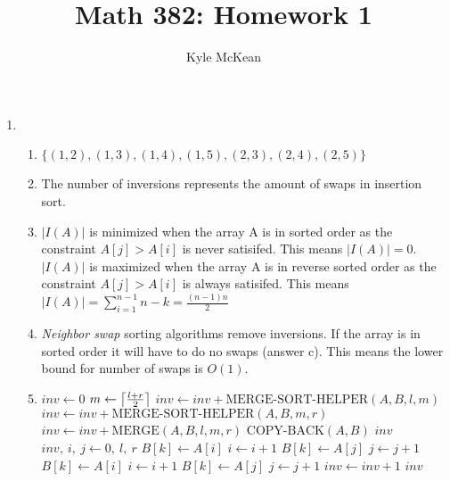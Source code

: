 \documentclass{article}
\title{Math 382: Homework 1}
\author{Kyle McKean}
\DeclarePairedDelimiter{\ceil}{\lceil}{\rceil}
\begin{document}
\maketitle

\begin{enumerate}

\item
  \begin{enumerate}
  \item $\{(1, 2), (1, 3), (1,4), (1,5), (2,3), (2,4), (2,5)\}$
  \item The number of inversions represents the amount of swaps in insertion sort.
  \item
    $|I(A)|$ is minimized when the array A is in sorted order as the constraint
    $A[j] > A[i]$ is never satisifed. This means $|I(A)| = 0$. \\
    $|I(A)|$ is maximized when the array A is in reverse sorted order as the constraint
    $A[j] > A[i]$ is always satisifed.
    This means $|I(A)| = \sum_{i = 1}^{n - 1}{n - k} = \frac{(n - 1)n}{2}$
  \item
    \textit{Neighbor swap} sorting algorithms remove inversions. If the array is in sorted order
    it will have to do no swaps (answer c). This means the lower bound for number of swaps is $O(1)$.
  \item
    \begin{algorithmic}[0]
        \State $inv \gets 0$
          \State $m \gets \ceil[\big]{\frac{l + r}{2}}$
          \State $inv \gets inv + \text{MERGE-SORT-HELPER}(A, B, l, m)$
          \State $inv \gets inv + \text{MERGE-SORT-HELPER}(A, B, m, r)$
          \State $inv \gets inv + \text{MERGE}(A, B, l, m, r)$
          \State $\text{COPY-BACK}(A, B)$
        \EndIf
        \State \Return $inv$
      \EndFunction
      \\
        \State $inv, \: i, \: j \gets 0, \: l, \: r$
            \State $B[k] \gets A[i]$
            \State $i \gets i + 1$
            \State $B[k] \gets A[j]$
            \State $j \gets j + 1$
          \Else
              \State $B[k] \gets A[i]$
              \State $i \gets i + 1$
            \Else
              \State $B[k] \gets A[j]$
              \State $j \gets j + 1$
              \State $inv \gets inv + 1$
            \EndIf
          \EndIf
        \EndFor
        \State \Return $inv$
      \EndFunction
    \end{algorithmic}
  \end{enumerate}


\end{enumerate}
\end{document}
